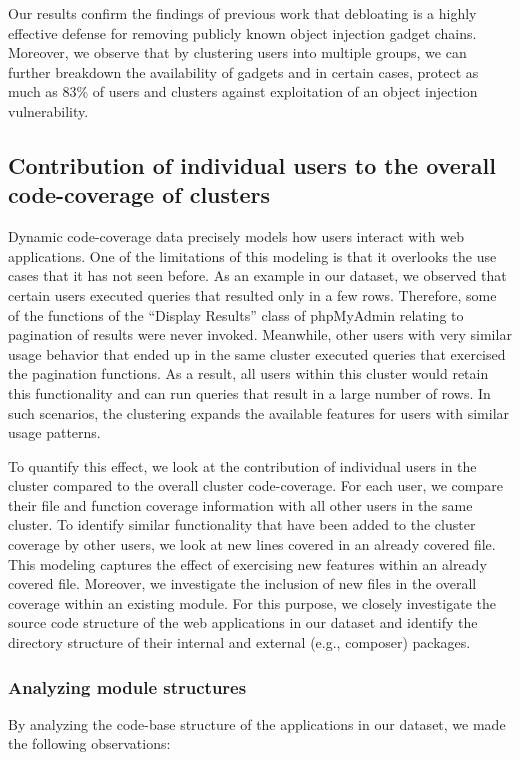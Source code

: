 Our results confirm the findings of previous work that debloating is a highly effective defense for removing publicly known object injection gadget chains. 
Moreover, we observe that by clustering users into multiple groups, we can further breakdown the availability of gadgets and in certain cases, protect as much as 83\% of users and clusters against exploitation of an object injection vulnerability.

\subsection{Contribution of individual users to the overall code-coverage of clusters}
\label{sec:augmented_coverage}

Dynamic code-coverage data precisely models how users interact with web applications. 
One of the limitations of this modeling is that it overlooks the use cases that it has not seen before. 
As an example in our dataset, we observed that certain users executed queries that resulted only in a few rows. 
Therefore, some of the functions of the ``Display Results'' class of phpMyAdmin relating to pagination of results were never invoked. 
Meanwhile, other users with very similar usage behavior that ended up in the same cluster executed queries that exercised the pagination functions. 
As a result, all users within this cluster would retain this functionality and can run queries that result in a large number of rows.
In such scenarios, the clustering expands the available features for users with similar usage patterns. 

To quantify this effect, we look at the contribution of individual users in the cluster compared to the overall cluster code-coverage. 
For each user, we compare their file and function coverage information with all other users in the same cluster. 
To identify similar functionality that have been added to the cluster coverage by other users, we look at new lines covered in an already covered file. 
This modeling captures the effect of exercising new features within an already covered file.
Moreover, we investigate the inclusion of new files in the overall coverage within an existing module. 
For this purpose, we closely investigate the source code structure of the web applications in our dataset and identify the directory structure of their internal and external (e.g., composer) packages. 

\subsubsection{Analyzing module structures} By analyzing the code-base structure of the applications in our dataset, we made the following observations:

